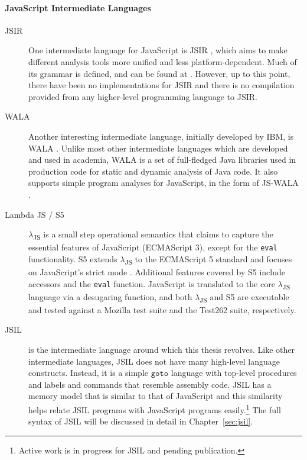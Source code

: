\documentclass[a4paper,11pt,twoside]{report}
\begin{document}
\paragraph{JavaScript Intermediate Languages}
\begin{description}
\item[JSIR] One intermediate language for JavaScript is JSIR \cite{Livshits:2016:Misc}, which aims to make different analysis tools more unified and less platform-dependent. Much of its grammar is defined, and can be found at \cite{Livshits:2016:Misc}. However, up to this point, there have been no implementations for JSIR and there is no compilation provided from any higher-level programming language to JSIR.

\item[WALA] Another interesting intermediate language, initially developed by IBM, is WALA \cite{WALA}. Unlike most other intermediate languages which are developed and used in academia, WALA is a set of full-fledged Java libraries used in production code for static and dynamic analysis of Java code. It also supports simple program analyses for JavaScript, in the form of JS-WALA \cite{WALA2}.

\item[Lambda JS / S5] $\lambda$\textsubscript{JS} \cite{Guha:2010} is a small step operational semantics that claims to capture the essential features of JavaScript (ECMAScript 3), except for the \texttt{eval} functionality. S5 extends $\lambda$\textsubscript{JS} to the ECMAScript 5 standard and focuses on JavaScript's strict mode \cite{Politz:2012}. Additional features covered by S5 include accessors and the \texttt{eval} function. JavaScript is translated to the core $\lambda$\textsubscript{JS} language via a desugaring function, and both $\lambda$\textsubscript{JS} and S5 are executable and tested against a Mozilla test suite and the Test262 suite, respectively.

\item[JSIL] is the intermediate language around which this thesis revolves. Like other intermediate languages, JSIL does not have many high-level language constructs. Instead, it is a simple $\texttt{goto}$ language with top-level procedures and labels and commands that resemble assembly code. JSIL has a memory model that is similar to that of JavaScript and this similarity helps relate JSIL programs with JavaScript programs easily.\footnote{Active work is in progress for JSIL and pending publication.} The full syntax of JSIL will be discussed in detail in Chapter~\ref{sec:jsil}.


\end{description}
\end{document}
